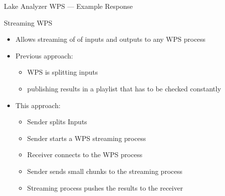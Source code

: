 \documentclass[xcolor=svgnames,professionalfonts,11pt,aspectratio=43]{beamer}
\begin{document}
\begin{frame}[c,fragile]{Lake Analyzer WPS --- Example Response}
\begin{figure}
  \end{figure}
\end{frame}


\begin{frame}[t]{Streaming WPS}
  \begin{itemize}
    \item Allows streaming of of inputs and outputs to any WPS process
    \pause
    \item Previous approach:
    \pause
    \begin{itemize}
      \item WPS is splitting inputs
      \pause
      \item publishing results in a playlist that has to be checked constantly
    \end{itemize}
    \pause
    \item This approach:
    \pause
    \begin{itemize}
      \item Sender splits Inputs
      \pause
      \item Sender starts a WPS streaming process
      \pause
      \item Receiver connects to the WPS process
      \pause
      \item Sender sends small chunks to the streaming process
      \pause
      \item Streaming process pushes the results to the receiver
    \end{itemize}
  \end{itemize}
\end{frame}
\end{document}
